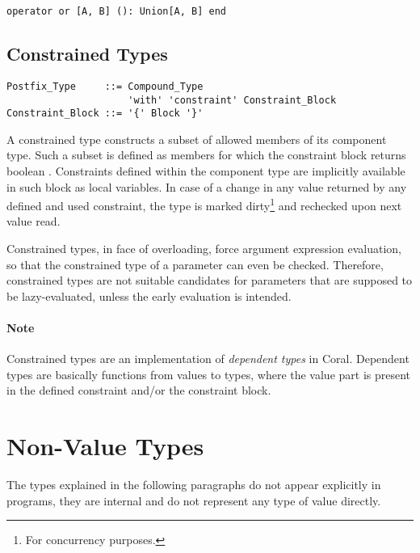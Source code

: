 \begin{lstlisting}
operator or [A, B] (): Union[A, B] end
\end{lstlisting}





\subsection{Constrained Types}
\label{sec:constrained-types}

\syntax\begin{lstlisting}
Postfix_Type     ::= Compound_Type 
                     'with' 'constraint' Constraint_Block
Constraint_Block ::= '{' Block '}'
\end{lstlisting}

A constrained type constructs a subset of allowed members of its component type. Such a subset is defined as members for which the constraint block returns boolean . Constraints defined within the component type are implicitly available in such block as local variables. In case of a change in any value returned by any defined and used constraint, the type is marked dirty\footnote{For concurrency purposes.} and rechecked upon next value read. 

Constrained types, in face of overloading, force argument expression evaluation, so that the constrained type of a parameter can even be checked. Therefore, constrained types are not suitable candidates for parameters that are supposed to be lazy-evaluated, unless the early evaluation is intended. 

\paragraph{Note}
Constrained types are an implementation of {\em dependent types} in Coral. Dependent types are basically functions from values to types, where the value part is present in the defined constraint and/or the constraint block. 





\section{Non-Value Types}

The types explained in the following paragraphs do not appear explicitly in programs, they are internal and do not represent any type of value directly. 






